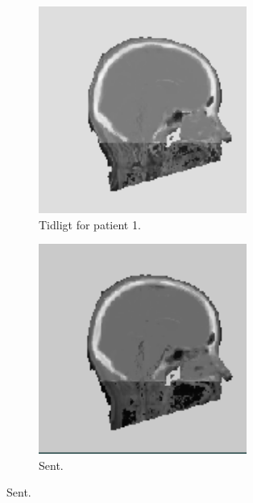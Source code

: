 \begin{figure}[H]
    \centering
    \begin{subfigure}{0.3\textwidth}
        \centering
        \includegraphics[width=0.75\textwidth]{colager/over_tid_sct/over_tid_sct_121280_early.png}
        \caption{Tidligt for patient 1.}
        \label{col:over_time_sct_pat1_early}
    \end{subfigure}\hfill
    \begin{subfigure}{0.3\textwidth}
        \centering
        \includegraphics[width=0.75\textwidth]{colager/over_tid_sct/over_tid_sct_121280_late.png}
        \caption{Sent.}
        \label{col:over_time_sct_pat1_late}
    \end{subfigure}\hfill

\end{figure}
